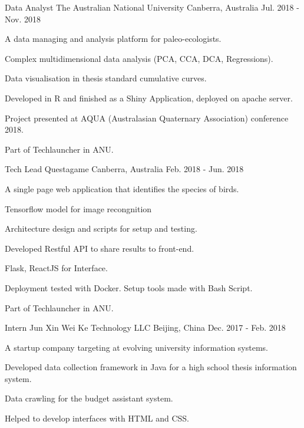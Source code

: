 \begin{cventries}
  \cventry
    {Data Analyst} %
    {The Australian National University} %
    {Canberra, Australia} %
    {Jul. 2018 - Nov. 2018} %
    {
      \begin{cvitems} %
        \item {A data managing and analysis platform for paleo-ecologists.}
        \item {Complex multidimensional data analysis (PCA, CCA, DCA, Regressions).}
        \item {Data visualisation in thesis standard cumulative curves.}
        \item {Developed in R and finished as a Shiny Application, deployed on apache server.}
        \item {Project presented at AQUA (Australasian Quaternary Association) conference 2018.}
        \item {Part of Techlauncher in ANU.}
      \end{cvitems}
    }

  \cventry
    {Tech Lead} %
    {Questagame} %
    {Canberra, Australia} %
    {Feb. 2018 - Jun. 2018} %
    {
      \begin{cvitems} %
        \item {A single page web application that identifies the species of birds.}
        \item {Tensorflow model for image recongnition}
        \item {Architecture design and scripts for setup and testing.}
        \item {Developed Restful API to share results to front-end.}
        \item {Flask, ReactJS for Interface.}
        \item {Deployment tested with Docker. Setup tools made with Bash Script.}
        \item {Part of Techlauncher in ANU.}
      \end{cvitems}
    }

  \cventry
    {Intern} %
    {Jun Xin Wei Ke Technology LLC} %
    {Beijing, China} %
    {Dec. 2017 - Feb. 2018} %
    {
      \begin{cvitems} %
      	\item{A startup company targeting at evolving university information systems.}
        \item {Developed data collection framework in Java for a high school thesis information system.}
        \item {Data crawling for the budget assistant system.}
        \item {Helped to develop interfaces with HTML and CSS.}
      \end{cvitems}
    }


\end{cventries}
